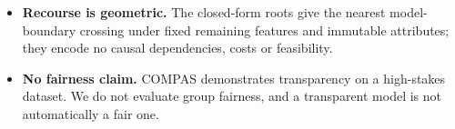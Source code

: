 \begin{itemize}
    pruning depth (14 instead of 20 iterations) and the quantization budget
    $(\Lambda_{\max}, \tau_{tol})$ were fixed with the single split available, so
    the single-split figures are operating points and the reported fidelity is not
    a held-out estimate. Repeating the German Credit $5\times5$ cross-validation
    at 20 iterations gives $72.90\pm2.47\%$ (Global Best) and $72.94\pm2.18\%$
    (Compact), so the depth choice moves the cross-validated mean by at most 0.2
    points. The bias-shifting step itself is exact; integer rounding is not.
    \item \textbf{Recourse is geometric.} The closed-form roots give the nearest
    model-boundary crossing under fixed remaining features and immutable
    attributes; they encode no causal dependencies, costs or feasibility.
    \item \textbf{No fairness claim.} COMPAS demonstrates transparency on a
    high-stakes dataset. We do not evaluate group fairness, and a transparent model
    is not automatically a fair one.
\end{itemize}
